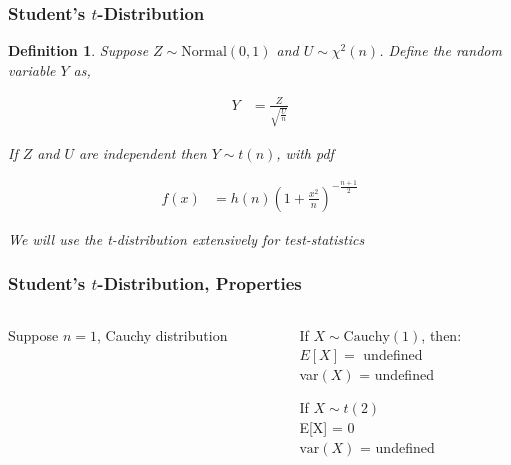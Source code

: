 \documentclass[aspectratio=169, handout]{beamer}
\newtheorem{defn}{Definition}
\numberwithin{equation}{section}
\begin{document}
\begin{frame}
\frametitle{Student's $t$-Distribution}

\begin{defn}
Suppose $Z \sim \text{Normal}(0, 1)$ and $U \sim \chi^2(n)$.  Define the random variable $Y$ as, 

\begin{align*}
Y &= \frac{Z}{\sqrt{\frac{U}{n}}}
\end{align*}

If $Z$ and $U$ are independent then $Y \sim t(n)$, with pdf 

\begin{align*}
f(x) &= h(n) \left(1 + \frac{x^2}{n}\right)^{-\frac{n+1}{2}} 
\end{align*}

We will use the t-distribution extensively for \alert{test-statistics}


\end{defn}

\end{frame}


\begin{frame}
\frametitle{Student's $t$-Distribution, Properties}
\begin{columns}
\begin{column}{0.5\textwidth}
Suppose $n = 1$, \alert{Cauchy} distribution

\end{column}
\begin{column}{0.5\textwidth}
If $X \sim \text{Cauchy}(1)$, then:\\\pause
$E[X] =$ undefined \\ \pause
var$(X)$ = undefined \\ \pause

If $X \sim t(2)$ \\ \pause
E[X] = 0  \\\pause
$\text{var}(X) $ = undefined
\end{column}
\end{columns}

\end{frame}
\end{document}
